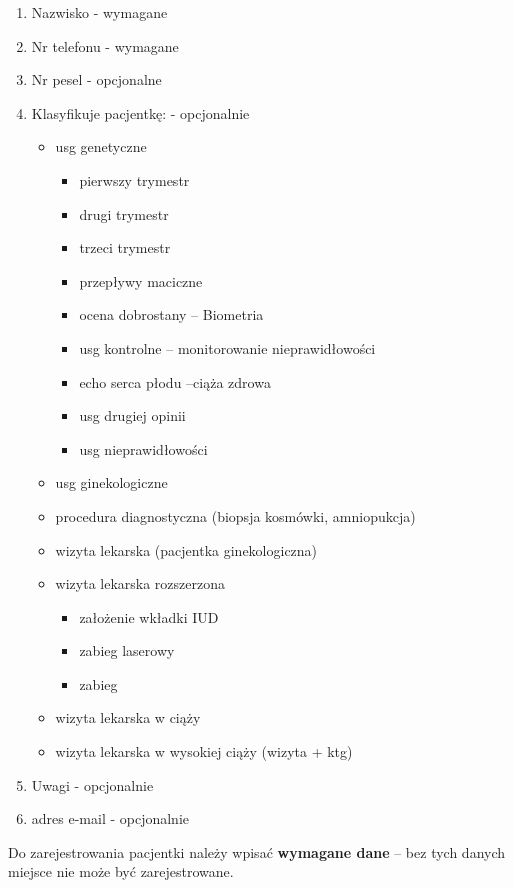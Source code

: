 \documentclass[polish,12pt]{aghthesis}
\begin{document}
\begin{itemize}
\begin{enumerate}
      \item Nazwisko - wymagane
      \item Nr telefonu - wymagane
      \item Nr pesel - opcjonalne
      \item Klasyfikuje pacjentkę: - opcjonalnie \begin{itemize}
          \item usg genetyczne \begin{itemize}
              \item pierwszy trymestr
              \item drugi trymestr
              \item trzeci trymestr
              \item przepływy maciczne
              \item ocena dobrostany – Biometria
              \item usg kontrolne – monitorowanie nieprawidłowości
              \item echo serca płodu –ciąża zdrowa
              \item usg drugiej opinii
              \item usg nieprawidłowości
          \end{itemize}
          \item usg ginekologiczne
          \item procedura diagnostyczna (biopsja kosmówki, amniopukcja)
          \item wizyta lekarska (pacjentka ginekologiczna)
          \item wizyta lekarska rozszerzona \begin{itemize}
              \item założenie wkładki IUD
              \item zabieg laserowy
              \item zabieg
          \end{itemize}
          \item wizyta lekarska w ciąży
          \item wizyta lekarska w wysokiej ciąży (wizyta + ktg)
      \end{itemize}
      \item Uwagi - opcjonalnie
      \item adres e-mail - opcjonalnie 
    \end{enumerate}
    Do zarejestrowania pacjentki należy wpisać \textbf{wymagane dane} – bez tych danych miejsce nie może być zarejestrowane.

\end{itemize}
\end{document}
